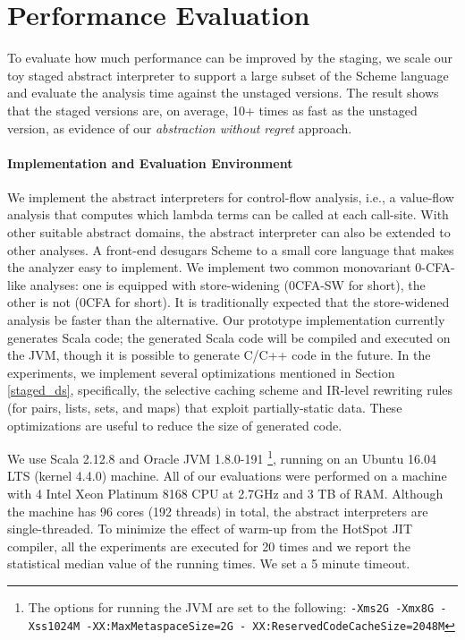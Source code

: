 \section{Performance Evaluation} \label{evaluation}

To evaluate how much performance can be improved by the staging, we scale our
toy staged abstract interpreter to support a large subset of the Scheme language and evaluate
the analysis time against the unstaged versions. The result shows that the
staged versions are, on average, 10+ times as fast as the unstaged version, as
evidence of our \textit{abstraction without regret} approach.

\vspace{-5pt}
\paragraph{Implementation and Evaluation Environment} We implement the abstract
interpreters for control-flow analysis, i.e., a value-flow analysis that
computes which lambda terms can be called at each call-site.
With other suitable abstract domains, the abstract interpreter
can also be extended to other analyses.
A front-end desugars Scheme to a small core language that makes the analyzer
easy to implement. We implement two common monovariant 0-CFA-like analyses: one
is equipped with store-widening (0CFA-SW for short), the other is not (0CFA
for short). It is traditionally expected that the store-widened analysis be faster than the
alternative.  Our prototype implementation currently generates Scala code; the
generated Scala code will be compiled and executed on the JVM, though it is possible to
generate C/C++ code in the future. In the experiments, we implement several
optimizations mentioned in Section \ref{staged_ds}, specifically, the selective
caching scheme and IR-level rewriting rules (for pairs, lists, sets, and maps)
that exploit partially-static data. These optimizations are useful to reduce
the size of generated code.

We use Scala 2.12.8 and Oracle JVM 1.8.0-191 \footnote{The options for
running the JVM are set to the following: \texttt{-Xms2G -Xmx8G -Xss1024M
-XX:MaxMetaspaceSize=2G - XX:ReservedCodeCacheSize=2048M}},
running on an Ubuntu 16.04 LTS (kernel 4.4.0) machine. All of our
evaluations were performed on a machine with 4 Intel Xeon Platinum
8168 CPU at 2.7GHz and 3 TB of RAM. Although the machine has 96 cores
(192 threads) in total, the abstract interpreters are single-threaded.
To minimize the effect of warm-up from the HotSpot JIT compiler,
all the experiments are executed for 20 times and we report the
statistical median value of the running times. We set a 5 minute
timeout.

